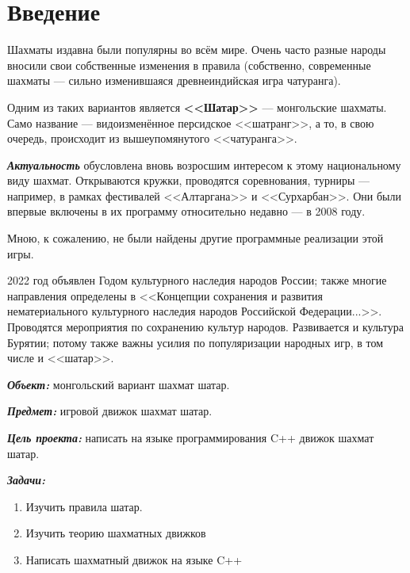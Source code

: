 {
	\chapter*{Введение}
	Шахматы издавна были популярны во всём мире. Очень часто разные народы вносили свои собственные изменения в правила (собственно, современные шахматы --- сильно изменившаяся древнеиндийская игра чатуранга). 
	
	Одним из таких вариантов является \textbf{<<Шатар>>} --- монгольские шахматы. Само название --- видоизменённое персидское <<шатранг>>, а то, в свою очередь, происходит из вышеупомянутого <<чатуранга>>.
	
	\textbf{\textit{Актуальность}} обусловлена вновь возросшим интересом к этому национальному виду шахмат. Открываются кружки, проводятся соревнования, турниры --- например, в рамках фестивалей <<Алтаргана>> и <<Сурхарбан>>. Они были впервые включены в их программу относительно недавно --- в 2008 году.
	
	Мною, к сожалению, не были найдены другие программные реализации этой игры.
	
	2022 год  объявлен Годом культурного наследия народов России; также многие направления определены в <<Концепции сохранения и развития нематериального культурного наследия народов Российской Федерации...>>. Проводятся мероприятия по сохранению культур народов. Развивается и культура Бурятии; потому  также важны  усилия по популяризации народных игр, в том числе и <<шатар>>.
	
	\textbf{\textit{Объект:}} монгольский вариант шахмат шатар.
	
	\textbf{\textit{Предмет:}} игровой движок шахмат шатар.
	
	\textbf{\textit{Цель проекта:}} написать на языке программирования C++ движок шахмат шатар.
	
	\textbf{\textit{Задачи:}}
	
	\begin{enumerate}
		\item Изучить правила шатар.
		\item Изучить теорию шахматных движков
		\item Написать шахматный движок на языке C++
	\end{enumerate}
	\clearpage
}